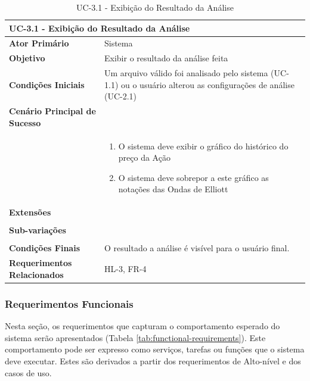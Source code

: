 \documentclass[12pt]{article}
\begin{document}
\begin{table}[H]
	\caption{UC-3.1 - Exibição do Resultado da Análise}
	\begin{tabular}{p{6cm} p{8cm}}
		\multicolumn{2}{l}{\large{\textbf{UC-3.1 - Exibição do Resultado da Análise}}}\\
		\toprule
		\textbf{Ator Primário}		&	Sistema \\
		\midrule
		\textbf{Objetivo}			&	Exibir o resultado da análise feita \\
		\midrule
		\textbf{Condições Iniciais}	&	Um arquivo válido foi analisado pelo sistema (UC-1.1)
										ou o usuário alterou as configurações de análise
										(UC-2.1)\\
		\midrule
		\textbf{Cenário Principal de Sucesso}	& \\
		& \begin{enumerate}
			\item O sistema deve exibir o gráfico do histórico do preço da Ação
			\item O sistema deve sobrepor a este gráfico as notações das Ondas de Elliott
		\end{enumerate}\\
		\midrule
		\textbf{Extensões}	& \\
		& \\
		\midrule
		\textbf{Sub-variações} & \\
		& \\
		\midrule
		\textbf{Condições Finais} & O resultado a análise é visível para o usuário final. \\
		\midrule
		\textbf{Requerimentos Relacionados} & HL-3, FR-4 \\
		\bottomrule
	\end{tabular}		
\end{table}
\endgroup

\subsubsection{Requerimentos Funcionais}

Nesta seção, os requerimentos que capturam o comportamento esperado do sistema serão
apresentados (Tabela \ref{tab:functional-requirements}). Este comportamento pode ser
expresso como serviços, tarefas ou funções que o sistema deve executar.
Estes são derivados a partir dos requerimentos de Alto-nível e dos casos de uso.
\end{document}
